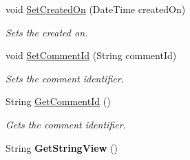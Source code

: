 \begin{DoxyCompactItemize}
void \hyperlink{classcom_1_1shephertz_1_1app42_1_1paas_1_1sdk_1_1csharp_1_1review_1_1_review_a0da4ff54e9c89579e9ea6d21982863f9}{Set\+Created\+On} (Date\+Time created\+On)
\begin{DoxyCompactList}\small\item\em Sets the created on. \end{DoxyCompactList}\item 
void \hyperlink{classcom_1_1shephertz_1_1app42_1_1paas_1_1sdk_1_1csharp_1_1review_1_1_review_aec3d2708b7fe3fba59e5729ace18015b}{Set\+Comment\+Id} (String comment\+Id)
\begin{DoxyCompactList}\small\item\em Sets the comment identifier. \end{DoxyCompactList}\item 
String \hyperlink{classcom_1_1shephertz_1_1app42_1_1paas_1_1sdk_1_1csharp_1_1review_1_1_review_ad5a40aa5283f4a8cb594189e213f2c84}{Get\+Comment\+Id} ()
\begin{DoxyCompactList}\small\item\em Gets the comment identifier. \end{DoxyCompactList}\item 
\hypertarget{classcom_1_1shephertz_1_1app42_1_1paas_1_1sdk_1_1csharp_1_1review_1_1_review_ab646a0c90cda6bbd44360f80e1b5e67f}{String {\bfseries Get\+String\+View} ()}\label{classcom_1_1shephertz_1_1app42_1_1paas_1_1sdk_1_1csharp_1_1review_1_1_review_ab646a0c90cda6bbd44360f80e1b5e67f}

\end{DoxyCompactItemize}
